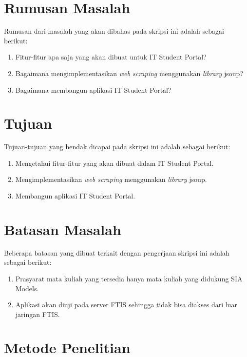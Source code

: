 \section{Rumusan Masalah}
\label{sec:rumusan_masalah}

Rumusan dari masalah yang akan dibahas pada skripsi ini adalah sebagai
berikut:
\begin{enumerate}
	\item Fitur-fitur apa saja yang akan dibuat untuk IT Student Portal?
	\item Bagaimana mengimplementasikan \textit{web scraping} menggunakan \textit{library} jsoup?
	\item Bagaimana membangun aplikasi IT Student Portal?
\end{enumerate}

\section{Tujuan}
\label{sec:tujuan}

Tujuan-tujuan yang hendak dicapai pada skripsi ini adalah sebagai berikut:
\begin{enumerate}
	\item	Mengetahui fitur-fitur yang akan dibuat dalam IT Student Portal.
	\item	Mengimplementasikan \textit{web scraping} menggunakan \textit{library} jsoup.
	\item Membangun aplikasi IT Student Portal.
\end{enumerate}

\section{Batasan Masalah}
\label{sec:batasan_masalah}

Beberapa batasan yang dibuat terkait dengan pengerjaan skripsi ini adalah sebagai berikut:
\begin{enumerate}
	\item Prasyarat mata kuliah yang tersedia hanya mata kuliah yang didukung SIA Models.
	\item Aplikasi akan diuji pada server FTIS sehingga tidak bisa diakses dari luar jaringan FTIS.
\end{enumerate}

\section{Metode Penelitian}
\label{sec:metode_penelitian}

